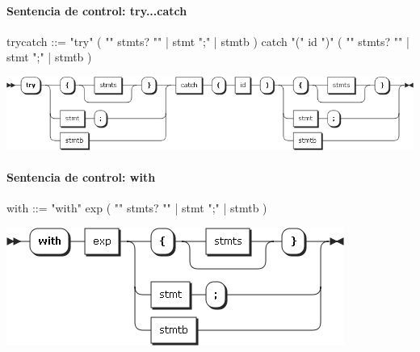 \paragraph{Sentencia de control: try...catch}

\begin{myverbatim}[style=nonumbers,basicstyle=\tiny]
trycatch ::= 
 "try" ( "{" stmts? "}" | stmt ";" | stmtb ) catch "(" id ")" ( "{" stmts? "}" | stmt ";" |  stmtb )
\end{myverbatim}  	
\begin{center}
\includegraphics[scale=0.4]{diagram/trycatch.png} \\
\end{center}

\pagebreak
\paragraph{Sentencia de control: with}
\begin{multicols}{2}
\begin{myverbatim}[style=nonumbers,basicstyle=\tiny]
with ::= 
 "with" exp ( "{" stmts? "}" | stmt ";" | stmtb )
\end{myverbatim}  	
\columnbreak
\begin{center}
\includegraphics[scale=0.4]{diagram/with.png} \\
\end{center}
\end{multicols}


